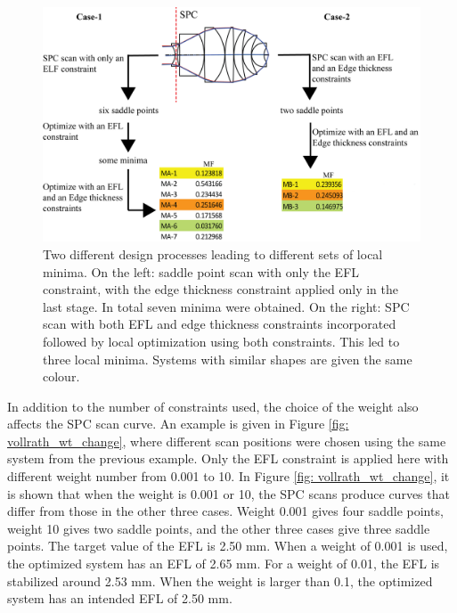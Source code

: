 \begin{figure}[h!]
    \centering
    \includegraphics[width=\textwidth]{chapter-4/figures/Vollrath_ConstraintDif_flow.png}
    \caption{Two different design processes leading to different sets of local minima. On the left: saddle point scan with only the EFL constraint, with the edge thickness constraint applied only in the last stage. In total seven minima were obtained. On the right: SPC scan with both EFL and edge thickness constraints incorporated followed by local optimization using both constraints. This led to three local minima. Systems with similar shapes are given the same colour.}
    \label{fig: vollrath_constr_flow}
\end{figure}

In addition to the number of constraints used, the choice of the weight also affects the SPC scan curve. An example is given in Figure \ref{fig: vollrath_wt_change}, where different scan positions were chosen using the same system from the previous example. Only the EFL constraint is applied here with different weight number from 0.001 to 10. In Figure \ref{fig: vollrath_wt_change}, it is shown that when the weight is 0.001 or 10, the SPC scans produce curves that differ from those in the other three cases. Weight 0.001 gives four saddle points, weight 10 gives two saddle points, and the other three cases give three saddle points. The target value of the EFL is 2.50 mm. When a weight of 0.001 is used, the optimized system has an EFL of 2.65 mm. For a weight of 0.01, the EFL is stabilized around 2.53 mm. When the weight is larger than 0.1, the optimized system has an intended EFL of 2.50 mm. 

